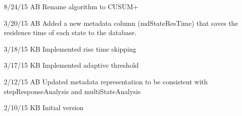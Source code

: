 \documentclass[letterpaper,10pt,english]{sphinxmanual}
\begin{document}
\begin{DUlineblock}{0em}
\item[] 8/24/15         AB      Rename algorithm to CUSUM+
\item[] 3/20/15         AB      Added a new metadata column (mdStateResTime) that saves the residence time of each state to the database.
\item[] 3/18/15         KB      Implemented rise time skipping
\item[] 3/17/15         KB      Implemented adaptive threshold
\item[] 2/12/15         AB      Updated metadata representation to be consistent with stepResponseAnalysis and multiStateAnalysis
\item[] 2/10/15         KB      Initial version
\end{DUlineblock}
\end{document}
